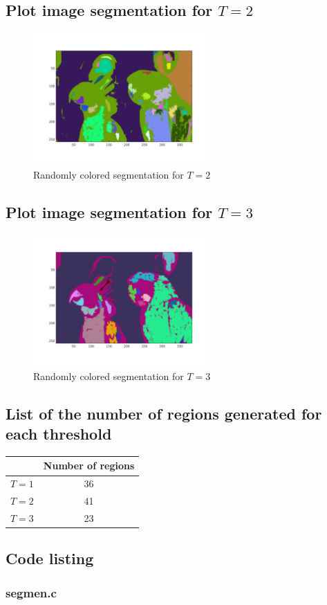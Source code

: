 \documentclass{article}
\begin{document}
\subsection{Plot image segmentation for $T=2$}
	\begin{figure}[h]
		\begin{center}
			\includegraphics[width=0.6\textwidth]{img22gd2_sm2.png}
			\caption{Randomly colored segmentation for $T=2$}
		\end{center}
	\end{figure}

\subsection{Plot image segmentation for $T=3$}
	\begin{figure}[h]
		\begin{center}
			\includegraphics[width=0.6\textwidth]{img22gd2_sm3.png}
			\caption{Randomly colored segmentation for $T=3$}
		\end{center}
	\end{figure}

\subsection{List of the number of regions generated for each threshold}
	\begin{center}
		\begin{tabular}{| l | c |}
		\hline
		& Number of regions \\ \hline
		$T=1$ & 36 \\ \hline
		$T=2$ & 41 \\ \hline
		$T=3$ & 23 \\ \hline
		\end{tabular}
	\end{center}

\subsection{Code listing}
	\subsubsection{segmen.c}
		\inputminted[tabsize=4,breaklines]{c}{segmen.c}
\end{document}
